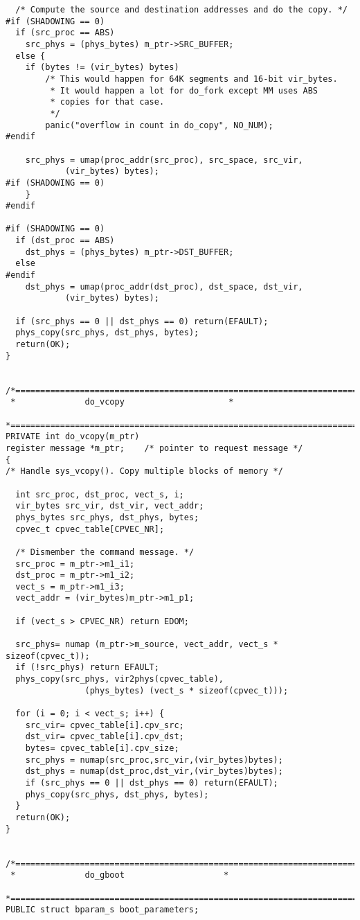 \begin{verbatim}
  /* Compute the source and destination addresses and do the copy. */
#if (SHADOWING == 0)
  if (src_proc == ABS)
	src_phys = (phys_bytes) m_ptr->SRC_BUFFER;
  else {
	if (bytes != (vir_bytes) bytes)
		/* This would happen for 64K segments and 16-bit vir_bytes.
		 * It would happen a lot for do_fork except MM uses ABS
		 * copies for that case.
		 */
		panic("overflow in count in do_copy", NO_NUM);
#endif

	src_phys = umap(proc_addr(src_proc), src_space, src_vir,
			(vir_bytes) bytes);
#if (SHADOWING == 0)
	}
#endif

#if (SHADOWING == 0)
  if (dst_proc == ABS)
	dst_phys = (phys_bytes) m_ptr->DST_BUFFER;
  else
#endif
	dst_phys = umap(proc_addr(dst_proc), dst_space, dst_vir,
			(vir_bytes) bytes);

  if (src_phys == 0 || dst_phys == 0) return(EFAULT);
  phys_copy(src_phys, dst_phys, bytes);
  return(OK);
}


/*===========================================================================*
 *				do_vcopy				     *
 *===========================================================================*/
PRIVATE int do_vcopy(m_ptr)
register message *m_ptr;	/* pointer to request message */
{
/* Handle sys_vcopy(). Copy multiple blocks of memory */

  int src_proc, dst_proc, vect_s, i;
  vir_bytes src_vir, dst_vir, vect_addr;
  phys_bytes src_phys, dst_phys, bytes;
  cpvec_t cpvec_table[CPVEC_NR];

  /* Dismember the command message. */
  src_proc = m_ptr->m1_i1;
  dst_proc = m_ptr->m1_i2;
  vect_s = m_ptr->m1_i3;
  vect_addr = (vir_bytes)m_ptr->m1_p1;

  if (vect_s > CPVEC_NR) return EDOM;

  src_phys= numap (m_ptr->m_source, vect_addr, vect_s * sizeof(cpvec_t));
  if (!src_phys) return EFAULT;
  phys_copy(src_phys, vir2phys(cpvec_table),
				(phys_bytes) (vect_s * sizeof(cpvec_t)));

  for (i = 0; i < vect_s; i++) {
	src_vir= cpvec_table[i].cpv_src;
	dst_vir= cpvec_table[i].cpv_dst;
	bytes= cpvec_table[i].cpv_size;
	src_phys = numap(src_proc,src_vir,(vir_bytes)bytes);
	dst_phys = numap(dst_proc,dst_vir,(vir_bytes)bytes);
	if (src_phys == 0 || dst_phys == 0) return(EFAULT);
	phys_copy(src_phys, dst_phys, bytes);
  }
  return(OK);
}


/*==========================================================================*
 *				do_gboot				    *
 *==========================================================================*/
PUBLIC struct bparam_s boot_parameters;


\end{verbatim}

